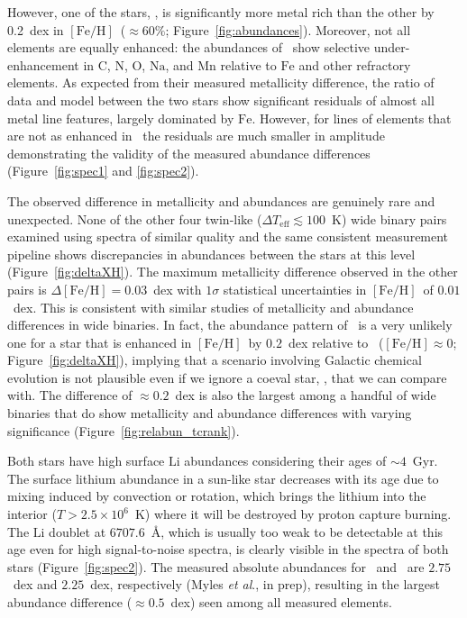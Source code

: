 \documentclass[12pt,letterpaper,margin=1in]{article}
\newcommand{\figname}{Figure}
\newcommand{\etal}{\textit{et al}.}
\newcommand*\elem[1]{\ensuremath{\mathrm{#1}}}
\newcommand*\elemH[1]{\ensuremath{[\mathrm{#1}/\elem{H}]}}
\newcommand*{\feh}{\ensuremath{\elemH{Fe}}}
\newcommand{\sunanalog}{\text{Krios}}
\newcommand{\bizarreone}{\text{Kronos}}
\begin{document}
However, one of the stars, \bizarreone, is significantly more metal rich than
the other by 0.2~dex in \feh\ ($\approx 60\%$; \figname~\ref{fig:abundances}).
Moreover, not all elements are equally enhanced: the abundances of \bizarreone\
show selective under-enhancement in \elem{C}, \elem{N}, \elem{O}, \elem{Na},
and \elem{Mn} relative to \elem{Fe} and other refractory elements.
As expected from their measured metallicity difference, the ratio of data and
model between the two stars show significant residuals of almost all metal line
features, largely dominated by \elem{Fe}.
However, for lines of elements that are not as enhanced in \bizarreone\, the
residuals are much smaller in amplitude demonstrating the validity of the
measured abundance differences (Figure~\ref{fig:spec1} and \ref{fig:spec2}).

The observed difference in metallicity and abundances are genuinely rare and
unexpected.
None of the other four twin-like ($\Delta T_\mathrm{eff} \lesssim 100$~K) wide
binary pairs examined using spectra of similar quality and the same
consistent measurement pipeline shows discrepancies in abundances between the
stars at this level\cite{2016ApJS..225...32B} (Figure~\ref{fig:deltaXH}).
The maximum metallicity difference observed in the other pairs is $\Delta\feh =
0.03$~dex with $1\sigma$ statistical uncertainties in \feh\ of $0.01$~dex.
This is consistent with similar studies of metallicity and abundance
differences in wide binaries\cite{Gratton:2001aa,Desidera:2004aa}.
In fact, the abundance pattern of \bizarreone\ is a very unlikely one
for a star that is enhanced in \feh\ by $0.2$~dex relative to \sunanalog\
($\feh\approx 0$; \figname~\ref{fig:deltaXH}),
implying that a scenario involving Galactic chemical evolution is not plausible
even if we ignore a coeval star, \sunanalog, that we can compare with.
The difference of $\approx 0.2$~dex is also the largest among a handful of wide
binaries that do show metallicity and abundance differences with varying
significance\cite{Mack:2014aa,Mack:2016aa,Saffe:2015aa,
  Teske:2013aa,Teske:2015aa,Teske:2016aa,Teske:2016ab,Biazzo:2015aa,Ramirez:2015aa}
(Figure~\ref{fig:relabun_tcrank}).

Both stars have high surface \elem{Li} abundances considering
their ages of $\sim 4$~Gyr.
The surface lithium abundance in a sun-like star decreases with its age due to
mixing induced by convection or rotation, which brings the lithium into the
interior ($T>2.5 \times 10^{6}$~K) where it will be destroyed by proton capture
burning. %
The \elem{Li} doublet at $6707.6$~\AA, which is usually too weak to be
detectable at this age even for high signal-to-noise spectra, is clearly
visible in the spectra of both stars (\figname~\ref{fig:spec2}).
The measured absolute abundances for \bizarreone\ and \sunanalog\ are
$2.75$~dex and $2.25$~dex, respectively (Myles \etal, in prep),
resulting in the largest abundance difference ($\approx 0.5$~dex) seen
among all measured elements.
\end{document}
